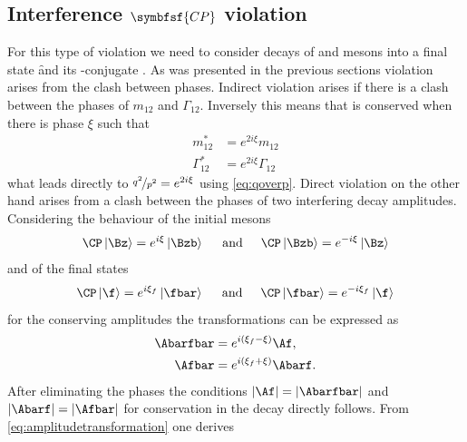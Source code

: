 \subsection[head={Interference \CP violation},tocentry={Interference \CP violation}]{Interference $\symbfsf{C{}P}$ violation}
\label{sec:InterferenceCPV}

For this type of \CP violation we need to consider decays of \Bz and \Bzb mesons into a final state \f and its \CP-conjugate \fbar.
As was presented in the previous sections \CP violation arises from the clash between phases.
Indirect \CP violation arises if there is a clash between the phases of $m_{12}$ and $\Gamma_{12}$.
Inversely this means that \CP is conserved when there is phase $\xi$ such that
\begin{equation}
\begin{split}
m_{12}^\ast &= e^{2i\xi}m_{12}\\
\Gamma_{12}^\ast &= e^{2i\xi}\Gamma_{12}\label{eq:CPconservationMixing}
\end{split}
\end{equation}
what leads directly to $\nicefrac{q^2}{p^2} = e^{2i\xi}$ using \cref{eq:qoverp}.
Direct \CP violation on the other hand arises from a clash between the phases of two interfering decay amplitudes.
Considering the behaviour of the initial \Bz mesons
\begin{equation}
\CP\left|\Bz\right> =e^{i\xi}\left|\Bzb\right>\hspace{0.5cm}\text{and}\hspace{0.5cm}\CP\left|\Bzb\right>=e^{-i\xi}\left|\Bz\right>
\end{equation}
and of the final states
\begin{equation}
\CP\left|\f\right> =e^{i\xi_f}\left|\fbar\right>\hspace{0.5cm}\text{and}\hspace{0.5cm}\CP\left|\fbar\right>=e^{-i\xi_f}\left|\f\right>
\end{equation}
for the \CP conserving amplitudes the transformations can be expressed as
\begin{equation}
\begin{split}
\Abarfbar&=e^{i\left(\xi_f-\xi\right)}\Af,\\
\Afbar&=e^{i\left(\xi_f+\xi\right)}\Abarf. \label{eq:amplitudetransformation}
\end{split}
\end{equation}
After eliminating the phases the conditions $\left|\Af\right|=\left|\Abarfbar\right|$ and $\left|\Abarf\right|=\left|\Afbar\right|$ for \CP conservation in the decay directly follows. From \cref{eq:amplitudetransformation} one derives
